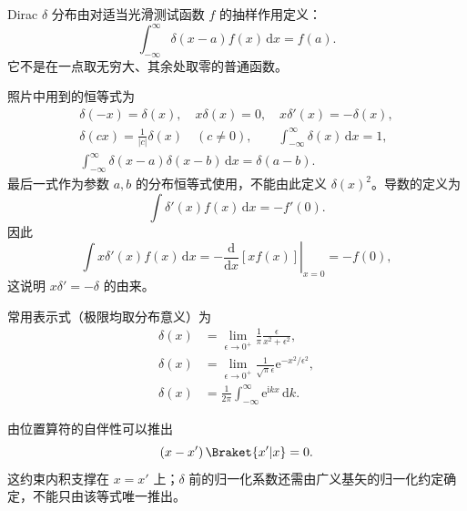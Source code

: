 \begin{definition}
Dirac $\delta$ 分布由对适当光滑测试函数 $f$ 的抽样作用定义：
\begin{equation}
\int_{-\infty}^{\infty}\delta\left(x-a\right)f\left(x\right)\,\mathrm{d}x=f\left(a\right).
\end{equation}
它不是在一点取无穷大、其余处取零的普通函数。
\end{definition}
照片中用到的恒等式为
\begin{gather}
\delta\left(-x\right)=\delta\left(x\right),\quad x\delta\left(x\right)=0,\quad
x\delta'\left(x\right)=-\delta\left(x\right),\\
\delta\left(cx\right)=\frac{1}{\left|c\right|}\delta\left(x\right)\quad\left(c\neq0\right),\qquad
\int_{-\infty}^{\infty}\delta\left(x\right)\,\mathrm{d}x=1,\\
\int_{-\infty}^{\infty}\delta\left(x-a\right)\delta\left(x-b\right)\,\mathrm{d}x=\delta\left(a-b\right).
\end{gather}
最后一式作为参数 $a,b$ 的分布恒等式使用，不能由此定义 $\delta\left(x\right)^2$。导数的定义为
\begin{equation}
\int\delta'\left(x\right)f\left(x\right)\,\mathrm{d}x=-f'\left(0\right).
\end{equation}
因此
\begin{equation}
\int x\delta'\left(x\right)f\left(x\right)\,\mathrm{d}x
=-\left.\frac{\mathrm{d}}{\mathrm{d}x}\left[xf\left(x\right)\right]\right|_{x=0}=-f\left(0\right),
\end{equation}
这说明 $x\delta'=-\delta$ 的由来。

常用表示式（极限均取分布意义）为
\begin{align}
\delta\left(x\right)&=\lim_{\epsilon\to0^+}\frac{1}{\pi}\frac{\epsilon}{x^2+\epsilon^2},\\
\delta\left(x\right)&=\lim_{\epsilon\to0^+}\frac{1}{\sqrt{\pi}\epsilon}
\mathrm{e}^{-x^2/\epsilon^2},\\
\delta\left(x\right)&=\frac{1}{2\pi}\int_{-\infty}^{\infty}\mathrm{e}^{\mathrm{i}kx}\,\mathrm{d}k.
\label{eq:delta-fourier}
\end{align}

由位置算符的自伴性可以推出
\begin{equation}
\left(x-x'\right)\Braket{x'|x}=0.
\end{equation}
这约束内积支撑在 $x=x'$ 上；$\delta$ 前的归一化系数还需由广义基矢的归一化约定确定，不能只由该等式唯一推出。

